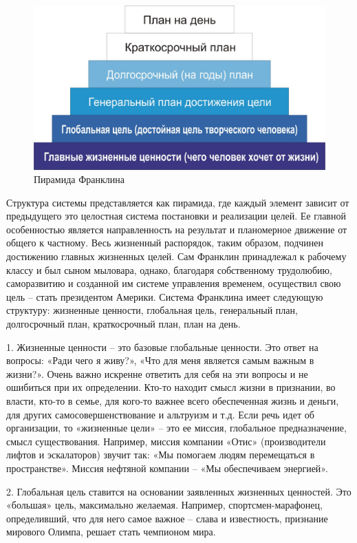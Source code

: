 \label{page:domain:piramida_franklina}
\begin{figure}
\centering
  \includegraphics[scale=0.85]{images/franklin_piramida.jpg}
  \caption{ Пирамида Франклина }
  \label{fig:domain:franklin}
\end{figure}


Структура системы представляется как пирамида, где каждый элемент зависит от предыдущего это целостная система постановки и реализации целей. Ее главной особенностью является направленность на результат и планомерное движение от общего к частному. Весь жизненный распорядок, таким образом, подчинен достижению главных жизненных целей. Сам Франклин принадлежал к рабочему классу и был сыном мыловара, однако, благодаря собственному трудолюбию, саморазвитию и созданной им системе управления временем, осуществил свою цель – стать президентом Америки. 
Система Франклина имеет следующую структуру: жизненные ценности, глобальная цель, генеральный план, долгосрочный план, краткосрочный план, план на день. 


1. Жизненные ценности – это базовые глобальные ценности. Это ответ на вопросы: «Ради чего я живу?», «Что для меня является самым важным в жизни?». Очень важно искренне ответить для себя на эти вопросы и не ошибиться при их определении. Кто-то находит смысл жизни в признании, во власти, кто-то в семье, для кого-то важнее всего обеспеченная жизнь и деньги, для других самосовершенствование и альтруизм и т.д. Если речь идет об организации, то «жизненные цели» – это ее миссия, глобальное предназначение, смысл существования. Например, миссия компании «Отис» (производители лифтов и эскалаторов) звучит так: «Мы помогаем людям перемещаться в пространстве». Миссия нефтяной компании – «Мы обеспечиваем энергией». 

2. Глобальная цель ставится на основании заявленных жизненных ценностей. Это «большая» цель, максимально желаемая. Например, спортсмен-марафонец, определивший, что для него самое важное – слава и известность, признание мирового Олимпа, решает стать чемпионом мира. 


